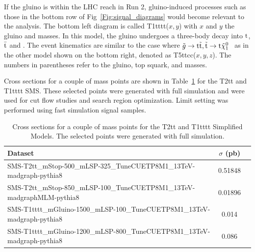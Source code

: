 If the gluino is within the LHC reach in Run 2, gluino-induced processes such as those in the bottom row of Fig~\ref{Fig:signal_diagrams} would become relevant to the analysis. The bottom left diagram is called T1tttt($x,y$) with $x$ and $y$ the gluino and \chiOneZero masses.
In this model, the gluino undergoes a three-body decay into \ensuremath{\rm t}, \ensuremath{\rm \bar{t}} and 
\chiOneZero. The event kinematics are similar to the case
where
$\tilde{g}\to\mathrm{t}\tilde{{\mathrm t}}, \tilde{{\mathrm t}}\to\mathrm{t}\tilde{\chi}^{0}_{1}$~\cite{CMS-SMS-paper}
as in the other model shown on the bottom right, denoted as 
T5ttcc($x,y,z$).
The numbers in parentheses refer to the gluino, top squark, and 
\chiOneZero masses. 

Cross sections for a couple of mass points are shown in 
Table~\ref{tab:signalMC} for the T2tt and T1tttt SMS. 
These selected points were generated with full simulation and were used for
cut flow studies and search region optimization. Limit setting was performed
using fast simulation signal samples.

\begin{table}[hp]
\centering
\caption{Cross sections for a couple of mass points for the T2tt and T1tttt Simplified Models. The selected points were generated with full simulation.} %
\label{tab:signalMC}
{\footnotesize
\begin{tabular}{lcc}
\hline \hline
Dataset & $\sigma$ (pb) \\
\hline
SMS-T2tt\_mStop-500\_mLSP-325\_TuneCUETP8M1\_13TeV-madgraph-pythia8 & 0.51848 \\
SMS-T2tt\_mStop-850\_mLSP-100\_TuneCUETP8M1\_13TeV-madgraphMLM-pythia8 & 0.01896 \\
\hline
SMS-T1tttt\_mGluino-1500\_mLSP-100\_TuneCUETP8M1\_13TeV-madgraph-pythia8 & 0.014 \\
SMS-T1tttt\_mGluino-1200\_mLSP-800\_TuneCUETP8M1\_13TeV-madgraph-pythia8 & 0.086 \\
\hline \hline
\end{tabular}
\footnotesize}
\end{table}

